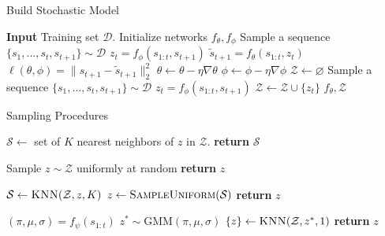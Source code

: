 \documentclass{article}
\begin{document}
\begin{minipage}[t]{7cm}
  \vspace{0pt}

  \begin{algorithm}[H]
    \caption{Build Stochastic Model}
  \begin{algorithmic}[1]
    \State \textbf{Input} Training set $\mathcal{D}$.
    \State Initialize networks $f_\theta, f_\phi$
    \State Sample a sequence $\{s_1, ..., s_t, s_{t+1}\} \sim \mathcal{D}$
    \State $z_t = f_{\phi}(s_{1:t}, s_{t+1})$
    \State $\tilde{s}_{t+1} = f_{\theta}(s_{1:t}, z_t)$
    \State $\ell(\theta, \phi) = \|s_{t+1} - \tilde{s}_{t+1} \|_2^2$
    \State $\theta \leftarrow \theta - \eta \nabla \theta$
    \State $\phi \leftarrow \phi - \eta \nabla \phi$
    \EndWhile
    \State $\mathcal{Z} \leftarrow \varnothing$
    \State Sample a sequence $\{s_1, ..., s_t, s_{t+1}\} \sim \mathcal{D}$
    \State $z_t = f_{\phi}(s_{1:t}, s_{t+1})$
    \State $\mathcal{Z} \leftarrow \mathcal{Z} \cup \{ z_t \}$
    \EndFor
    \Return $f_\theta, \mathcal{Z}$
    \State
  \end{algorithmic}
  \end{algorithm}
\end{minipage}%
\begin{minipage}[t]{7cm}
  \vspace{0pt}

\begin{algorithm}[H]
  \caption{Sampling Procedures}\label{algo-sample}
  \begin{algorithmic}[1]
    \State $\mathcal{S} \gets $ set of $K$ nearest neighbors of $z$ in $\mathcal{Z}$.
    \State \textbf{return} $\mathcal{S}$
    \EndProcedure

    \State Sample $z \sim \mathcal{Z}$ uniformly at random
    \State \textbf{return} $z$
    \EndProcedure

    \State $\mathcal{S} \gets \textsc{KNN}(\mathcal{Z}, z, K)$
    \State $z \gets \textsc{SampleUniform}(\mathcal{S})$
    \State \textbf{return} $z$
    \EndProcedure

    \State $(\pi, \mu, \sigma) = f_\psi(s_{1:t})$
    \State $z^* \sim \mbox{GMM}(\pi, \mu, \sigma)$
    \State $\{z\} \gets \textsc{KNN}(\mathcal{Z}, z^*, 1)$
    \State \textbf{return} $z$
    \EndProcedure
    \State
  \end{algorithmic}
\end{algorithm}
\end{minipage}
\end{document}
